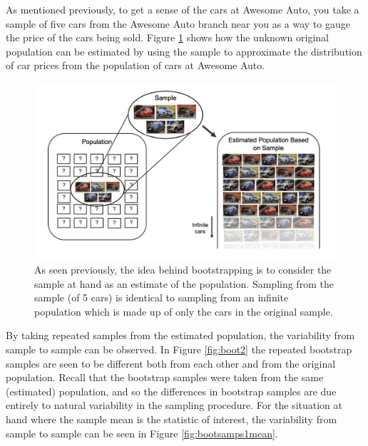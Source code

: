 \documentclass[
  10pt,
  openany]{book}
\begin{document}
As mentioned previously, to get a sense of the cars at Awesome Auto, you take a sample of five cars from the Awesome Auto branch near you as a way to gauge the price of the cars being sold.
Figure \ref{fig:bootpop1mean} shows how the unknown original population can be estimated by using the sample to approximate the distribution of car prices from the population of cars at Awesome Auto.

\begin{figure}[h]

{\centering \includegraphics[width=0.8\linewidth]{images/bootpop1mean} 

}

\caption{As seen previously, the idea behind bootstrapping is to consider the sample at hand as an estimate of the population.  Sampling from the sample (of 5 cars) is identical to sampling from an infinite population which is made up of only the cars in the original sample.}\label{fig:bootpop1mean}
\end{figure}

By taking repeated samples from the estimated population, the variability from sample to sample can be observed.
In Figure \ref{fig:boot2} the repeated bootstrap samples are seen to be different both from each other and from the original population.
Recall that the bootstrap samples were taken from the same (estimated) population, and so the differences in bootstrap samples are due entirely to natural variability in the sampling procedure.
For the situation at hand where the sample mean is the statistic of interest, the variability from sample to sample can be seen in Figure \ref{fig:bootsamps1mean}.
\end{document}
